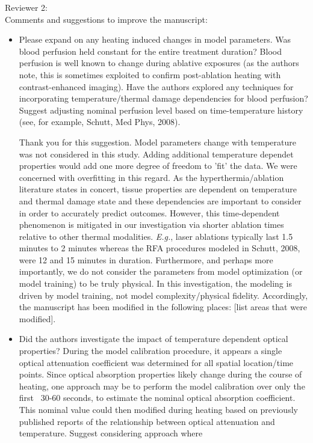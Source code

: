 \documentclass[letterpaper,12pt]{report}
\begin{document}
Reviewer 2:\\
Comments and suggestions to improve the manuscript:\\
\begin{itemize}
\item
Please expand on any heating induced changes in model parameters. Was blood perfusion held constant for the
entire treatment duration? Blood perfusion is well
known to change during ablative exposures (as the
authors note, this is sometimes exploited to confirm post-ablation heating with contrast-enhanced imaging).  Have the authors explored any techniques for
incorporating temperature/thermal damage dependencies for blood perfusion? Suggest adjusting nominal
perfusion level based on time-temperature history (see, for example, Schutt, Med Phys, 2008).

{\color{red}
Thank you for this suggestion. Model parameters change with temperature was
not considered in this study. 
Adding additional temperature dependet
properties would add one more degree of freedom to 'fit' the data. 
We were concerned with overfitting in this regard.
As the hyperthermia/ablation literature states in concert, tissue properties
are dependent on temperature and thermal damage state and these dependencies
are important to consider in order to accurately predict
outcomes. 
However, this time-dependent phenomenon is mitigated in our investigation via shorter ablation
times relative to other thermal modalities. \textit{E.g.}, laser ablations typically last 1.5 minutes to 2 minutes
whereas the RFA procedures modeled in Schutt, 2008, were 12 and 15 minutes in duration. Furthermore, and
perhaps more importantly, we do not consider the parameters from model optimization (or model
training) to be truly physical. In this investigation, the modeling is driven by model training, not model
complexity/physical fidelity. 
Accordingly, the manuscript has been
modified in the following places:
{\color{green}[list areas that were modified]}.
}
\item
Did the authors investigate the impact of temperature dependent optical properties? During the model
calibration procedure, it appears a single optical attenuation coefficient was determined for all spatial
location/time points. Since optical absorption properties likely change during the course of heating,
one approach may be to perform the model calibration over only the first ~30-60 seconds, to estimate the
nominal optical absorption coefficient. This nominal value could then modified during heating based on
previously published reports of the relationship between optical attenuation and temperature. Suggest
considering approach where


\end{itemize}
\end{document}
